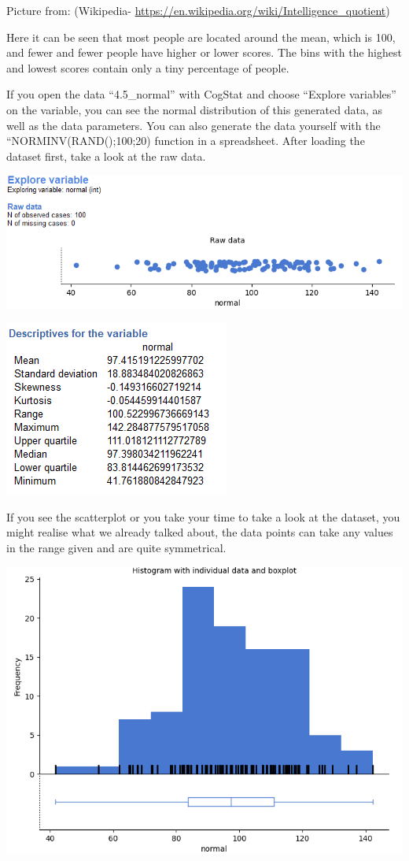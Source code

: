 \documentclass[
]{book}
\begin{document}
Picture from: (Wikipedia- \url{https://en.wikipedia.org/wiki/Intelligence_quotient})

Here it can be seen that most people are located around the mean, which is 100, and fewer and fewer people have higher or lower scores. The bins with the highest and lowest scores contain only a tiny percentage of people.

If you open the data ``4.5\_normal'' with CogStat and choose ``Explore variables'' on the variable, you can see the normal distribution of this generated data, as well as the data parameters. You can also generate the data yourself with the ``NORMINV(RAND();100;20) function in a spreadsheet. After loading the dataset first, take a look at the raw data.

\includegraphics{img/ch4/4.5expvarraw.png}

\includegraphics{img/ch4/4.5expvarrawdescr.png}

If you see the scatterplot or you take your time to take a look at the dataset, you might realise what we already talked about, the data points can take any values in the range given and are quite symmetrical.

\includegraphics{img/ch4/4.5normalhisto.png}
\end{document}
